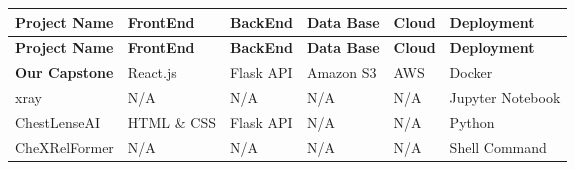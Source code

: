 \documentclass[12pt, titlepage]{article}
\begin{document}
\begin{longtable}{|l|l|l|l|l|l|}
\hline
\textbf{Project Name}   & \textbf{FrontEnd}       & \textbf{BackEnd}   & \textbf{Data Base} & \textbf{Cloud} & \textbf{Deployment} \\ \hline
\endfirsthead
\hline
\textbf{Project Name}   & \textbf{FrontEnd}       & \textbf{BackEnd}   & \textbf{Data Base} & \textbf{Cloud} & \textbf{Deployment} \\ \hline
\endhead
\hline
\endfoot

\textbf{Our Capstone}    & React.js               & Flask API          & Amazon S3          & AWS             & Docker             \\ \hline
xray                    & N/A                    & N/A                & N/A                & N/A             & Jupyter Notebook   \\ \hline
ChestLenseAI            & HTML \& CSS             & Flask API          & N/A                & N/A             & Python             \\ \hline
CheXRelFormer           & N/A                    & N/A                & N/A                & N/A             & Shell Command      \\ \hline

\end{longtable}
\end{document}
